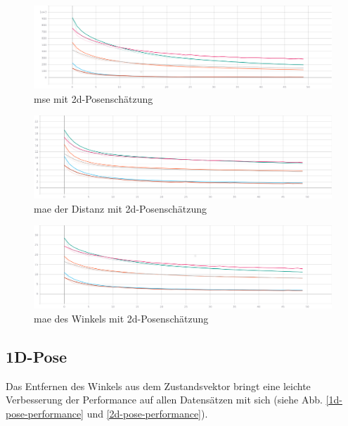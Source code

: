 \begin{figure}[H]
	\centering
	\includegraphics[width=\linewidth]{kapitel5/images/tensorboard/single-loss/Loss-single-loss.png}
	\caption{\acs{mse} mit \acs{2d}-Posenschätzung}
	\label{2d-poses-mse}
\end{figure}

\begin{figure}[H]
	\centering
	\includegraphics[width=\linewidth]{kapitel5/images/tensorboard/single-loss/Mean_Abs_Error_d-single-loss.png}
	\caption{\acs{mae} der Distanz mit \acs{2d}-Posenschätzung}
	\label{2d-poses-mae-d}
\end{figure}

\begin{figure}[H]
	\centering
	\includegraphics[width=\linewidth]{kapitel5/images/tensorboard/single-loss/Mean_Abs_Error_a-single-loss.png}
	\caption{\acs{mae} des Winkels mit \acs{2d}-Posenschätzung}
	\label{2d-poses-mae-a}
\end{figure}

\subsection{1D-Pose}

Das Entfernen des Winkels aus dem Zustandsvektor bringt eine leichte Verbesserung der Performance auf allen Datensätzen mit sich (siehe Abb. \ref{1d-pose-performance} und \ref{2d-pose-performance}). 

